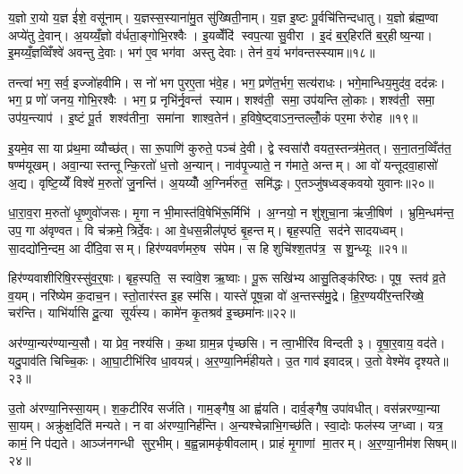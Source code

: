 य॒ज्ञो रा॒यो य॒ज्ञ ई॑शे॒ वसू॑नाम्। य॒ज्ञस्स॒स्याना॑मु॒त सु॑ख्षिती॒नाम्। य॒ज्ञ इ॒ष्टः पू॒र्वचि॑त्तिन्दधातु। य॒ज्ञो ब्र॑ह्म॒ण्वा अप्ये॑तु दे॒वान्। अ॒यय्यँ॒ज्ञो व॑र्धता॒ङ्गोभि॒रश्वैः। इ॒यव्वेँदि॑ स्वप॒त्या सु॒वीरा। इ॒दं ब॒र्॒हिरति॑ ब॒र्॒हीष्य॒न्या। इ॒मय्यँ॒ज्ञव्विँश्वे॑ अवन्तु दे॒वाः। भग॑ ए॒व भग॑वा अस्तु देवाः। तेन॑ व॒यं भग॑वन्तस्स्याम॥१८॥

तन्त्वा॑ भग॒ सर्व॒ इज्जो॑हवीमि। स नो॑ भग पुरए॒ता भ॑वे॒ह। भग॒ प्रणे॑त॒र्भग॒ सत्य॑राधः। भगे॒मान्धिय॒मुद॑व॒ दद॑न्नः। भग॒ प्र णो॑ जनय॒ गोभि॒रश्वैः। भग॒ प्र नृभि॑र्नृ॒वन्त॑ स्याम। शश्व॑ती॒ समा॒ उप॑यन्ति लो॒काः। शश्व॑ती॒ समा॒ उप॑य॒न्त्याप॑। इ॒ष्टं पू॒र्त शश्व॑तीना॒ समा॑ना शाश्व॒तेन॑। ह॒विषे॒ष्ट्वाऽन॒न्तल्लोँ॒कं पर॒मा रु॑रोह ॥१९॥

इ॒यमे॒व सा या प्र॑थ॒मा व्यौच्छ॑त्। सा रू॒पाणि॑ कुरुते॒ पञ्च॑ दे॒वी। द्वे स्वसा॑रौ वयत॒स्तन्त्र॑मे॒तत्। स॒ना॒तन॒व्विँत॑त॒ षण्म॑यूखम्। अवा॒न्यास्तन्तून्कि॒रतो॑ ध॒त्तो अ॒न्यान्। नाव॑पृ॒ज्याते॒ न ग॑माते॒ अन्तम्। आ वो॑ यन्तूदवा॒हासो॑ अ॒द्य। वृष्टि॒य्येँ विश्वे॑ म॒रुतो॑ जु॒नन्ति॑। अ॒यय्योँ अ॒ग्निर्म॑रुत॒ समि॑द्धः। ए॒तञ्जु॑षध्वङ्कवयो युवानः॥२०॥

धा॒रा॒व॒रा म॒रुतो॑ धृ॒ष्णुवो॑जसः। मृ॒गा न भी॒मास्त॑वि॒षेभि॑रू॒र्मिभि॑। अ॒ग्नयो॒ न शु॑शुचा॒ना ऋ॑जी॒षिण॑। भ्रुमि॒न्धम॑न्त॒ उप॒ गा अ॑वृण्वत। वि च॑क्रमे॒ त्रिर्दे॒वः। आ वे॒धस॒न्नील॑पृष्ठं बृ॒हन्तम्। बृह॒स्पति॒ सद॑ने सादयध्वम्। सा॒दद्यो॑नि॒न्दम॒ आ दी॑दि॒वासम्। हिर॑ण्यवर्णमरु॒ष स॑पेम। स हि शुचि॑श्श॒तप॑त्र॒ स शु॒न्ध्यूः ॥२१॥

हिर॑ण्यवाशीरिषि॒रस्सु॑व॒र्॒षाः। बृह॒स्पति॒ स स्वा॑वे॒श ऋ॒ष्वाः। पू॒रू सखि॑भ्य आसु॒तिङ्क॑रिष्ठः। पूष॒ स्तव॑ व्र॒ते व॒यम्। नरि॑ष्येम क॒दाच॒न। स्तो॒तार॑स्त इ॒ह स्म॑सि। यास्ते॑ पूष॒न्ना वो॑ अ॒न्तस्स॑मु॒द्रे। हि॒र॒ण्ययी॑र॒न्तरि॑ख्षे॒ चर॑न्ति। याभि॑र्यासि दू॒त्या सूर्य॑स्य। कामे॑न कृ॒तश्रव॑ इ॒च्छमा॑नः॥२२॥

अर॑ण्या॒न्यर॑ण्यान्य॒सौ। या प्रेव॒ नश्य॑सि। क॒था ग्राम॒न्न पृ॑च्छसि। न त्वा॒भीरि॑व विन्दती ३। वृ॒षा॒र॒वाय॒ वद॑ते। यदु॒पाव॑ति चिच्चि॒कः। आ॒घा॒टीभि॑रिव धा॒वयन्न्॑। अ॒र॒ण्या॒निर्म॑हीयते। उ॒त गाव॑ इवादन्न्। उ॒तो वेश्मे॑व दृश्यते॥२३॥

उ॒तो अ॑रण्या॒निस्सा॒यम्। श॒क॒टीरि॑व सर्जति। गाम॒ङ्गैष॒ आ ह्व॑यति। दार्व॒ङ्गैष॒ उपा॑वधीत्। वस॑न्नरण्या॒न्या सा॒यम्। अक्रु॑क्ष॒दिति॑ मन्यते। न वा अ॑रण्या॒निर्\mbox{}ह॑न्ति। अ॒न्यश्चेन्नाभि॒गच्छ॑ति। स्वा॒दोः फल॑स्य ज॒ग्ध्वा। यत्र॒ कामं॒ नि प॑द्यते। आञ्ज॑नगन्धी सुर॒भीम्। ब॒ह्व॒न्नामकृ॑षीवलाम्। प्राहं मृ॒गाणां मा॒तरम्। अ॒र॒ण्या॒नीम॑शसिषम्॥२४॥\anuvakamend[स्या॒म॒ रु॒रो॒ह॒ यु॒वा॒न॒श्शु॒न्ध्यूरि॒च्छमा॑नो दृश्यते॒ निप॑द्यते च॒त्वारि॑ च]

